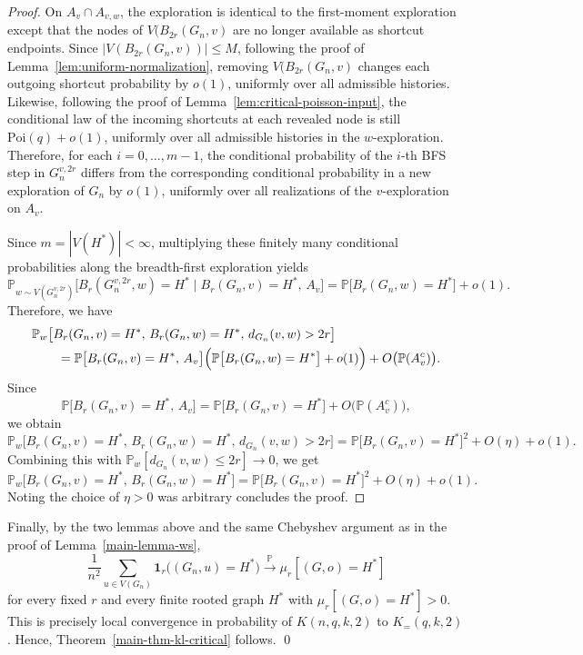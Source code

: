 \documentclass[10pt]{amsart}
\begin{document}
\begin{proof}
On \(A_v\cap A_{v,w}\), the exploration is identical to the first-moment exploration except that the nodes of
\(V(B_{2r}(G_n,v)\) are no longer available as shortcut endpoints. Since \(|V(B_{2r}(G_n,v))|\le M\), following the proof of
Lemma~\ref{lem:uniform-normalization}, removing \(V(B_{2r}(G_n,v)\) changes each outgoing shortcut probability by \(o(1)\),
uniformly over all admissible histories. Likewise, following the proof of
Lemma~\ref{lem:critical-poisson-input}, the conditional law of the incoming shortcuts at each revealed node
is still \(\mathrm{Poi}(q)+o(1)\), uniformly over all admissible histories in the \(w\)-exploration. Therefore, for each
\(i=0,\dots,m-1\), the conditional probability of the \(i\)-th BFS step in \(G_n^{v,2r}\) differs from the corresponding
conditional probability in a new exploration of \(G_n\) by \(o(1)\), uniformly over all realizations of the
\(v\)-exploration on \(A_v\).

Since \(m=|V(H^*)|<\infty\), multiplying these finitely many conditional probabilities along the breadth-first
exploration yields
\[
\mathbb P_{w\sim V(G_n^{v,2r})}\bigl[B_r(G_n^{v,2r},w)=H^* \mid B_r(G_n,v)=H^*,\,A_v\bigr]
=
\mathbb P\bigl[B_r(G_n,w)=H^*\bigr]+o(1).
\]
Therefore, we have
\begin{align*}
&\mathbb P_w\bigl[B_r(G_n,v)=H^*,\,B_r(G_n,w)=H^*,\,d_{G_n}(v,w)>2r\bigr] \\
&\qquad=
\mathbb P\bigl[B_r(G_n,v)=H^*,\,A_v\bigr]
\Bigl(\mathbb P\bigl[B_r(G_n,w)=H^*\bigr]+o(1)\Bigr)
+O\bigl(\mathbb P(A_v^c)\bigr).
\end{align*}
Since
\[
\mathbb P\bigl[B_r(G_n,v)=H^*,\,A_v\bigr]
=
\mathbb P\bigl[B_r(G_n,v)=H^*\bigr]+O\bigl(\mathbb P(A_v^c)\bigr),
\]
we obtain
\[
\mathbb P_w\bigl[B_r(G_n,v)=H^*,\,B_r(G_n,w)=H^*,\,d_{G_n}(v,w)>2r\bigr]
=
\mathbb P\bigl[B_r(G_n,v)=H^*\bigr]^2+O(\eta)+o(1).
\]
Combining this with \(\mathbb P_w[d_{G_n}(v,w)\le 2r]\to 0\), we get
\[
\mathbb P_w\bigl[B_r(G_n,v)=H^*,\,B_r(G_n,w)=H^*\bigr]
=
\mathbb P\bigl[B_r(G_n,v)=H^*\bigr]^2+O(\eta)+o(1).
\]
Noting the choice of \(\eta>0\) was arbitrary concludes the proof.
\end{proof}

Finally, by the two lemmas above and the same Chebyshev argument as in the proof of Lemma~\ref{main-lemma-ws},
\[
\frac1{n^2}\sum_{u\in V(G_n)} \mathbf 1_r\big((G_n,u)=H^*\big)
\xrightarrow{\mathbb P}
\mu_r\left[(G,o)=H^*\right]
\]
for every fixed \(r\) and every finite rooted graph \(H^*\) with \(\mu_r\left[(G,o)=H^*\right]>0\). This is precisely
local convergence in probability of \(K(n,q,k,2)\) to \(K_{=}(q,k,2)\). Hence, Theorem~\ref{main-thm-kl-critical}
follows. \qed
\end{document}
